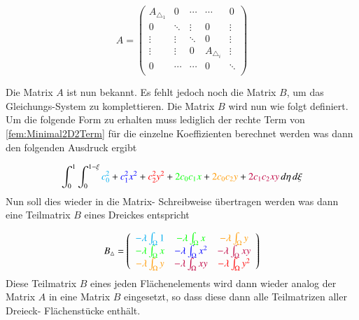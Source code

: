 \begin{equation}
 A =	\begin{pmatrix}
	A_{\triangle_1} & 0 & \cdots & \cdots & 0 \\
	0 & \ddots & \vdots & 0 & \vdots \\
	\vdots & \vdots & \ddots & 0 & \vdots \\
	\vdots & \vdots & 0 & A_{\triangle_i} & \vdots \\
	0 & \cdots & \cdots & 0 &  \ddots \\
	\end{pmatrix}
\end{equation}

Die Matrix $A$ ist nun bekannt. Es fehlt jedoch noch die Matrix $B$, um das Gleichungs-System zu komplettieren. Die Matrix $B$ wird nun wie folgt definiert. Um die folgende Form zu erhalten muss lediglich der rechte Term von \ref{fem:Minimal2D2Term} für die einzelne Koeffizienten berechnet werden was dann den folgenden Ausdruck ergibt

\begin{equation}
			\int_0^1 \int_0^{1 - \xi}  \textcolor{cyan}{c_0^2} + \textcolor{blue}{c_1^2 x^2} + \textcolor{red}{c_2^2 y^2} + \textcolor{green}{2 c_0 c_1 x} + \textcolor{orange}{2 c_0 c_2 y} +\textcolor{purple}{ 2 c_1 c_2 xy} \,  d\eta \, d \xi
			\label{fem:Minimal2LinAlgB}
\end{equation}
Nun soll dies wieder in die Matrix- Schreibweise übertragen werden was dann eine Teilmatrix $B$ eines Dreickes entspricht

\begin{equation}
 B_{\triangle} = \left( \begin{array}{ccc}
	\textcolor{cyan}{- \lambda \int_{\Omega} 1} &  \textcolor{green}{- \lambda \int_{\Omega} x} & \textcolor{orange}{- \lambda \int_{\Omega} y}  \\
	\textcolor{green}{- \lambda \int_{\Omega}x} & \textcolor{blue}{- \lambda \int_{\Omega} x^2} &  \textcolor{purple}{- \lambda \int_{\Omega} xy} \\
	\textcolor{orange}{- \lambda \int_{\Omega} y} & \textcolor{purple}{- \lambda \int_{\Omega} xy} & \textcolor{red}{ - \lambda \int_{\Omega} y^2} \\
	\end{array}\right)
	\label{fem:MatrixB}
\end{equation}
Diese Teilmatrix $B$ eines jeden Flächenelements wird dann wieder analog der Matrix $A$ in eine Matrix $B$ eingesetzt, so dass diese dann alle Teilmatrizen aller Dreieck-  Flächenstücke enthält.

